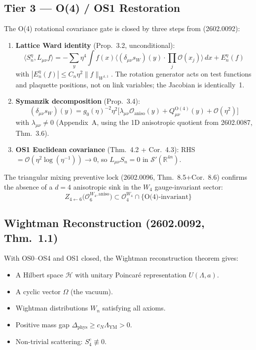\documentclass[11pt,a4paper]{article}
\begin{document}
\subsection{Tier 3 --- O(4) / OS1 Restoration}

The O(4) rotational covariance gate is closed by three steps from (2602.0092):

\begin{enumerate}
\item \textbf{Lattice Ward identity} (Prop.~3.2, unconditional):
  \[
  \langle S^\eta_n, L_{\mu\nu} f \rangle =
  -\sum_y \eta^4 \int f(x) \langle (\delta_{\mu\nu} s_W)(y) \cdot
  \prod_j \mathcal{O}(x_j) \rangle\,dx + E^\eta_n(f)
  \]
  with $|E^\eta_n(f)| \leq C_n \eta^2 \|f\|_{W^{1,1}}$.  The rotation
  generator acts on test functions and plaquette positions, not on link
  variables; the Jacobian is identically~1.

\item \textbf{Symanzik decomposition} (Prop.~3.4):
  \[
  (\delta_{\mu\nu} s_W)(y) = g_0(\eta)^{-2} \eta^2
  \bigl[ \lambda_{\mu\nu} \mathcal{O}_{\mathrm{aniso}}(y) +
  Q^{\mathrm{O}(4)}_{\mu\nu}(y) + \mathcal{O}(\eta^2) \bigr]
  \]
  with $\lambda_{\mu\nu} \neq 0$ (Appendix~A, using the 1D anisotropic
  quotient from 2602.0087, Thm.~3.6).

\item \textbf{OS1 Euclidean covariance} (Thm.~4.2 + Cor.~4.3):
  RHS $= \mathcal{O}(\eta^2 \log(\eta^{-1})) \to 0$, so
  $L_{\mu\nu} S_n = 0$ in $\mathcal{S}'(\mathbb{R}^{4n})$.
\end{enumerate}

The triangular mixing preventive lock (2602.0096, Thm.~8.5+Cor.~8.6) confirms
the absence of a $d=4$ anisotropic sink in the $W_4$ gauge-invariant
sector:
\[
Z_{4\leftarrow 6}\bigl(\mathcal{O}^{W_4,\text{aniso}}_6\bigr) \subset
\mathcal{O}^{W_4}_4 \cap \{\text{O(4)-invariant}\}
\]

\subsection{Wightman Reconstruction (2602.0092, Thm.~1.1)}

With OS0--OS4 and OS1 closed, the Wightman reconstruction theorem gives:
\begin{itemize}
\item A Hilbert space $\mathcal{H}$ with unitary Poincar\'e representation
  $U(\Lambda,a)$.
\item A cyclic vector $\Omega$ (the vacuum).
\item Wightman distributions $W_n$ satisfying all axioms.
\item Positive mass gap $\Delta_{\mathrm{phys}} \geq c_N \Lambda_{\mathrm{YM}} > 0$.
\item Non-trivial scattering: $S^c_4 \not\equiv 0$.
\end{itemize}
\end{document}
